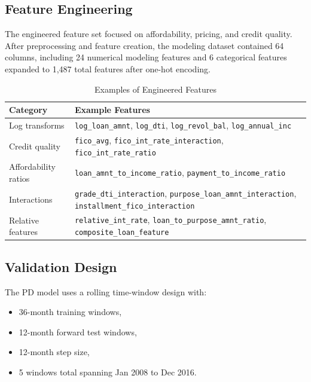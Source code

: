 \documentclass[12pt]{article}
\begin{document}
\subsection{Feature Engineering}

The engineered feature set focused on affordability, pricing, and credit quality. After preprocessing and feature creation, the modeling dataset contained 64 columns, including 24 numerical modeling features and 6 categorical features expanded to 1,487 total features after one-hot encoding.

\begin{table}[H]
\centering
\caption{Examples of Engineered Features}
\begin{tabularx}{\textwidth}{>{\raggedright\arraybackslash}p{} X}
\toprule
Category & Example Features \\
\midrule
Log transforms & \texttt{log\_loan\_amnt}, \texttt{log\_dti}, \texttt{log\_revol\_bal}, \texttt{log\_annual\_inc} \\
Credit quality & \texttt{fico\_avg}, \texttt{fico\_int\_rate\_interaction}, \texttt{fico\_int\_rate\_ratio} \\
Affordability ratios & \texttt{loan\_amnt\_to\_income\_ratio}, \texttt{payment\_to\_income\_ratio} \\
Interactions & \texttt{grade\_dti\_interaction}, \texttt{purpose\_loan\_amnt\_interaction}, \texttt{installment\_fico\_interaction} \\
Relative features & \texttt{relative\_int\_rate}, \texttt{loan\_to\_purpose\_amnt\_ratio}, \texttt{composite\_loan\_feature} \\
\bottomrule
\end{tabularx}
\end{table}

\subsection{Validation Design}

The PD model uses a rolling time-window design with:

\begin{itemize}[leftmargin=1.5em]
    \item 36-month training windows,
    \item 12-month forward test windows,
    \item 12-month step size,
    \item 5 windows total spanning Jan 2008 to Dec 2016.
\end{itemize}
\end{document}
